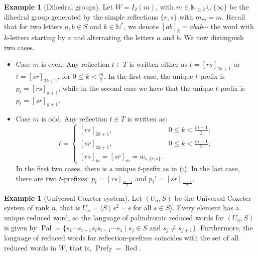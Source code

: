 \documentclass{amsart}
\theoremstyle{definition}
\newtheorem{Example}[Theorem]{Example}
\newcommand{\Red}{{\operatorname{Red}}}
\newcommand{\RPal}{\operatorname{Pal}}
\newcommand{\Pref}{\operatorname{Pref}}
\begin{document}
\begin{Example}[Dihedral groups] Let $W=I_2(m)$, with $m\in \mathbb{N}_{\geq 2}\cup \{\infty\}$ be the dihedral group generated by the simple reflections $\{r,s\}$ with $m_{rs}=m$. Recall that for two letters $a,b\in S$ and $k\in \mathbb N^*$, we denote $[ab]_k=abab\cdots$ the word with $k$-letters starting by $a$ and alternating the letters $a$ and $b$. We now distinguish two cases.
\begin{itemize}
    \item[(i)] Case $m$ is even. Any reflection $t\in T$ is written either as $t=[rs]_{2k+1}$ or $t=[sr]_{2k+1}$, for $0\leq k < \frac{m}{2}$. In the first case, the unique $t$-prefix is $p_t=[rs]_{k+1}$, while in the second case we have that the unique $t$-prefix is $p_t=[sr]_{k+1}$.
    \item[(ii)] Case $m$ is odd. Any reflection $t\in T$ is written as:
    \begin{equation*}
        t=\begin{cases}
            [rs]_{2k+1},& 0\leq k < \frac{m-1}{2};\\
            [sr]_{2k+1},& 0\leq k < \frac{m-1}{2};\\
            [rs]_m=[sr]_m = w_{\circ, \{r,s\}}.
        \end{cases}
    \end{equation*}
    In the first two cases, there is a unique $t$-prefix as in (i). In the last case, there are two $t$-prefixes: $p_t=[rs]_{\frac{m-1}{2}}$ and $p_t'=[sr]_{\frac{m-1}{2}}$.
\end{itemize}
\end{Example}

\begin{Example}[Universal Coxeter system]
    Let $(U_n, S)$ be the Universal Coxeter system of rank $n$, that is $U_n=\langle S\mid s^2=e \ \mbox{for all $s \in S$} \rangle$. Every element has a unique reduced word, so the language of palindromic reduced words for $(U_n,S)$ is given by $\RPal= \{s_1\cdots s_{i-1}s_is_{i-1}\cdots s_1 \mid s_j\in S \mbox{ and } s_j\neq s_{j+1}\}$. Furthermore, the language of reduced words for reflection-prefixes coincides with the set of all reduced words in $W$, that is, $\Pref_T=\Red$.
\end{Example}
\end{document}
